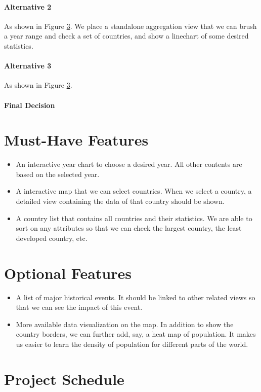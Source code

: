 \documentclass[12pt, fullpage,letterpaper]{article}
\begin{document}
\paragraph{Alternative 2}
As shown in Figure \ref{}.
We place a standalone aggregation view that we can brush a year range and check a set of countries, and
show a linechart of some desired statistics.

\paragraph{Alternative 3}
As shown in Figure \ref{}.

\paragraph{Final Decision}




\section{Must-Have Features}
\begin{itemize}
    \item An interactive year chart to choose a desired year. All other contents are based on the selected year.
    \item A interactive map that we can select countries. When we select a country, a detailed view containing the data of that country should be shown.
    \item A country list that contains all countries and their statistics. We are able to sort on any attributes so that we can check the largest country, the least developed country, etc.
\end{itemize}
\section{Optional Features}
\begin{itemize}
    \item A list of major historical events. It should be linked to other related views so that we can see the impact of this event.
    \item More available data visualization on the map. In addition to show the country borders, we can further add, say, a heat map of population. It makes us easier to learn the density of population for different parts of the world.
\end{itemize}
\section{Project Schedule}
\end{document}
